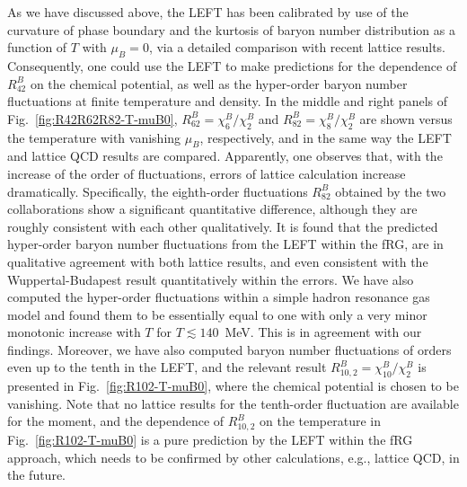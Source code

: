 \documentclass[%
reprint,
superscriptaddress,
showpacs,preprintnumbers,
amsmath,amssymb,
aps,
prd,
]{revtex4-1}
\def\Fig#1{Fig.~\ref{#1}} \def\Tab#1{Tab.~\ref{#1}}
\begin{document}
	As we have discussed above, the LEFT has been calibrated by use of the curvature of phase boundary and the kurtosis of baryon number distribution as a function of $T$ with $\mu_B=0$, via a detailed comparison with recent lattice results. Consequently, one could use the LEFT to make predictions for the dependence of $R^{B}_{42}$ on the chemical potential, as well as the hyper-order baryon number fluctuations at finite temperature and density. In the middle and right panels of \Fig{fig:R42R62R82-T-muB0}, $R^{B}_{62}=\chi^{B}_{6}/\chi^{B}_{2}$ and $R^{B}_{82}=\chi^{B}_{8}/\chi^{B}_{2}$ are shown versus the temperature with vanishing $\mu_B$, respectively, and in the same way the LEFT and lattice QCD results are compared. Apparently, one observes that, with the increase of the order of fluctuations, errors of lattice calculation increase dramatically. Specifically, the eighth-order fluctuations $R^{B}_{82}$ obtained by the two collaborations show a significant quantitative difference, although they are roughly consistent with each other qualitatively. It is found that the predicted hyper-order baryon number fluctuations from the LEFT within the fRG, are in qualitative agreement with both lattice results, and even consistent with the Wuppertal-Budapest result quantitatively within the errors. We have also computed the hyper-order fluctuations within a simple hadron resonance gas model \cite{BraunMunzinger:2003zd} and found them to be essentially equal to one with only a very minor monotonic increase with $T$ for $T \lesssim 140$~MeV. This is in agreement with our findings. Moreover, we have also computed baryon number fluctuations of orders even up to the tenth in the LEFT, and the relevant result $R^{B}_{10,2}=\chi^{B}_{10}/\chi^{B}_{2}$ is presented in \Fig{fig:R102-T-muB0}, where the chemical potential is chosen to be vanishing. Note that no lattice results for the tenth-order fluctuation are available for the moment, and the dependence of $R^{B}_{10,2}$ on the temperature in \Fig{fig:R102-T-muB0} is a pure prediction by the LEFT within the fRG approach, which needs to be confirmed by other calculations, e.g., lattice QCD, in the future.
	
\end{document}
